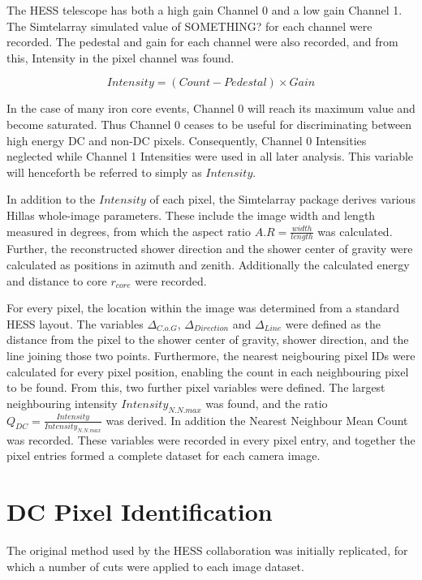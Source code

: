 \documentclass[]{article}
\begin{document}
The HESS telescope has both a high gain Channel 0 and a low gain Channel 1. The Sim\textunderscore telarray simulated value of SOMETHING? for each channel were recorded. The pedestal and gain for each channel were also recorded, and from this, Intensity in the pixel channel was found.

\[ Intensity = (Count - Pedestal)\times Gain \]

In the case of many iron core events, Channel 0 will reach its maximum value and become saturated. Thus Channel 0 ceases to be useful for discriminating between high energy DC and non-DC pixels. Consequently, Channel 0 Intensities neglected while Channel 1 Intensities were used in all later analysis. This variable will henceforth be referred to simply as $Intensity$.

In addition to the $Intensity$ of each pixel, the Sim\textunderscore telarray package derives various Hillas whole-image parameters. These include the image width and length measured in degrees, from which the aspect ratio $A.R = \frac{width}{length}$ was calculated. Further, the reconstructed shower direction and the shower center of gravity were calculated as positions in azimuth and zenith. Additionally the calculated energy and distance to core $r_{core}$ were recorded.

For every pixel, the location within the image was determined from a standard HESS layout. The variables $ \Delta_{C.o.G}$, $\Delta_{Direction}$ and $\Delta_{Line}$ were defined as the distance from the pixel to the shower center of gravity, shower direction, and the line joining those two points. Furthermore, the nearest neigbouring pixel IDs were calculated for every pixel position, enabling the count in each neighbouring pixel to be found. From this, two further pixel variables were defined. The largest neighbouring intensity $Intensity_{N.N.max}$ was found, and the ratio $ Q_{DC} = \frac{Intensity}{Intensity_{N.N.max}} $ was derived. In addition the Nearest Neighbour Mean Count was recorded. These variables were recorded in every pixel entry, and together the pixel entries formed a complete dataset for each camera image.

\section{DC Pixel Identification}  
The original method used by the HESS collaboration \cite{hess07} was initially replicated, for which a number of cuts were applied to each image dataset.
\end{document}
